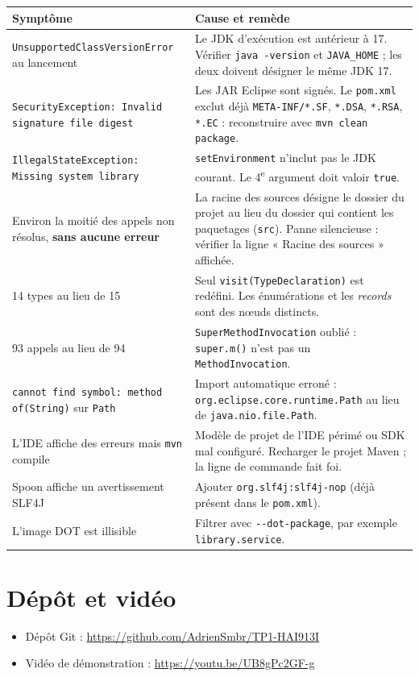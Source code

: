 \documentclass[11pt,a4paper]{article}
\begin{document}
\begin{table}[H]
\centering
\small
\begin{tabular}{@{}p{6.2cm}p{9.2cm}@{}}
\toprule
\textbf{Symptôme} & \textbf{Cause et remède} \\
\midrule
\texttt{UnsupportedClassVersionError} au lancement & Le JDK d'exécution est antérieur à 17. Vérifier \texttt{java -version} et \texttt{JAVA\_HOME} ; les deux doivent désigner le même JDK 17. \\
\texttt{SecurityException: Invalid signature file digest} & Les JAR Eclipse sont signés. Le \texttt{pom.xml} exclut déjà \texttt{META-INF/*.SF}, \texttt{*.DSA}, \texttt{*.RSA}, \texttt{*.EC} : reconstruire avec \texttt{mvn clean package}. \\
\texttt{IllegalStateException: Missing system library} & \texttt{setEnvironment} n'inclut pas le JDK courant. Le 4\textsuperscript{e} argument doit valoir \texttt{true}. \\
Environ la moitié des appels non résolus, \textbf{sans aucune erreur} & La racine des sources désigne le dossier du projet au lieu du dossier qui contient les paquetages (\texttt{src}). Panne silencieuse : vérifier la ligne « Racine des sources » affichée. \\
14 types au lieu de 15 & Seul \texttt{visit(TypeDeclaration)} est redéfini. Les énumérations et les \textit{records} sont des n\oe{}uds distincts. \\
93 appels au lieu de 94 & \texttt{SuperMethodInvocation} oublié : \texttt{super.m()} n'est pas un \texttt{MethodInvocation}. \\
\texttt{cannot find symbol: method of(String)} sur \texttt{Path} & Import automatique erroné : \texttt{org.eclipse.core.runtime.Path} au lieu de \texttt{java.nio.file.Path}. \\
L'IDE affiche des erreurs mais \texttt{mvn} compile & Modèle de projet de l'IDE périmé ou SDK mal configuré. Recharger le projet Maven ; la ligne de commande fait foi. \\
Spoon affiche un avertissement SLF4J & Ajouter \texttt{org.slf4j:slf4j-nop} (déjà présent dans le \texttt{pom.xml}). \\
L'image DOT est illisible & Filtrer avec \texttt{-{}-dot-package}, par exemple \texttt{library.service}. \\
\bottomrule
\end{tabular}
\end{table}

\section{Dépôt et vidéo}

\begin{itemize}
    \item Dépôt Git : \url{https://github.com/AdrienSmbr/TP1-HAI913I}
    \item Vidéo de démonstration : \url{https://youtu.be/UB8gPc2GF-g}
\end{itemize}
\end{document}
